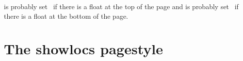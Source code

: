 \begin{plainlist}
\begin{lcode}
\renewcommand*{\@addtotoporbot}{%
  \@getfpsbit \tw@
  \ifodd \@tempcnta
    \@flsetnum \@topnum
    \ifnum \@topnum>\z@
      \@tempswafalse
      \@flcheckspace \@toproom \@toplist
      \if@tempswa
        \@bitor\@currtype{\@midlist\@botlist}%
        \if@test
        \else
          \@flupdates \@topnum \@toproom \@toplist
          \@inserttrue
  \global\floatattoptrue
        \fi
      \fi
    \fi
  \fi
  \if@insert
  \else
    \@addtobot
  \fi}

\renewcommand*{\@addtobot}{%
  \@getfpsbit 4\relax
  \ifodd \@tempcnta
    \@flsetnum \@botnum
    \ifnum \@botnum>\z@
      \@tempswafalse
      \@flcheckspace \@botroom \@botlist
      \if@tempswa
        \global \maxdepth \z@
        \@flupdates \@botnum \@botroom \@botlist
        \@inserttrue
  \global\floatatbottrue
      \fi
    \fi
  \fi}

\let\p@wold@output\@outputpage
\renewcommand*{\@outputpage}{%
  \p@wold@output
  \global\floatattopfalse
  \global\floatatbotfalse}

\endinput
\end{lcode}
 is probably set \ptrue\ if there is a float at the 
top of the page and
 is probably set \ptrue\ if there is a float at the bottom
of the page.



\section{The showlocs pagestyle}


\end{plainlist}

